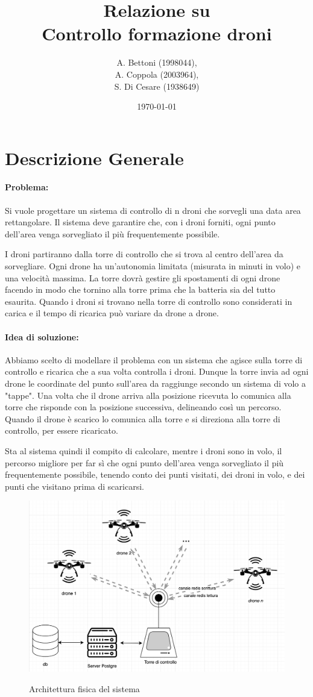 \documentclass[a4paper, 11pt]{article}
\title{Relazione su \\
Controllo formazione droni}
\author{A. Bettoni (1998044),\\ A. Coppola (2003964),\\S. Di Cesare (1938649)}
\date{\today}
\begin{document}
\maketitle
\newpage
\tableofcontents
\newpage
\section{Descrizione Generale}
\paragraph*{Problema:}
Si vuole progettare un sistema di controllo di n droni che sorvegli una data area rettangolare.
Il sistema deve garantire che, con i droni forniti, ogni punto dell'area venga sorvegliato il più frequentemente possibile.

I droni partiranno dalla torre di controllo che si trova al centro dell'area da sorvegliare.
Ogni drone ha un'autonomia limitata (misurata in minuti in volo) e una velocità massima. 
La torre dovrà gestire gli spostamenti di ogni drone facendo in modo che tornino alla torre prima che la batteria sia del tutto esaurita. 
Quando i droni si trovano nella torre di controllo sono considerati in carica e il tempo di ricarica può variare da drone a drone.
\paragraph*{Idea di soluzione:}
Abbiamo scelto di modellare il problema con un sistema che agisce sulla torre di controllo e ricarica che a sua volta controlla i droni.
Dunque la torre invia ad ogni drone le coordinate del punto sull'area da raggiunge secondo un sistema di volo a "tappe".
Una volta che il drone arriva alla posizione ricevuta lo comunica alla torre che risponde con la posizione successiva, delineando così un percorso.
Quando il drone è scarico lo comunica alla torre e si direziona alla torre di controllo, per essere ricaricato.

Sta al sistema quindi il compito di calcolare, mentre i droni sono in volo, il percorso migliore per far sì che ogni punto dell'area venga sorvegliato 
il più frequentemente possibile, tenendo conto dei punti visitati, dei droni in volo, e dei punti che visitano prima di scaricarsi.
\begin{figure}[h]
    \centering
    \includegraphics[height = 7.2 cm]{image/Architettura.png}\\
    \caption{Architettura fisica del sistema}
\end{figure}
\newpage
\end{document}
